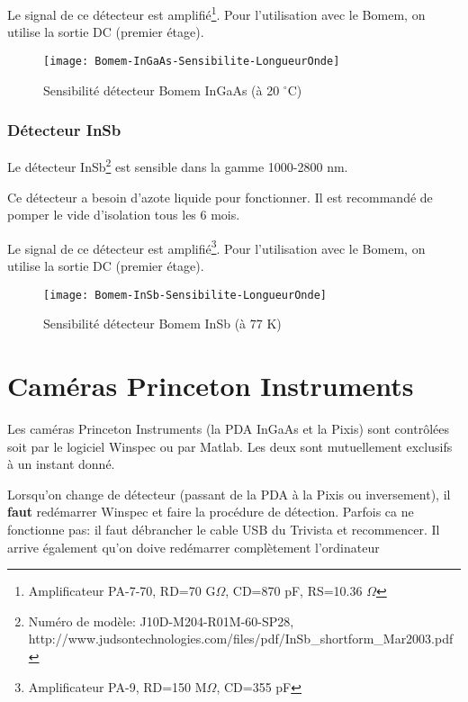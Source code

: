 \documentclass[11pt,francais]{book} %
\begin{document}
Le signal de ce détecteur est amplifié\footnote{Amplificateur PA-7-70, RD=70 G$\Omega$, CD=870 pF, RS=10.36 $\Omega$}.
Pour l'utilisation avec le Bomem, on utilise la sortie DC (premier étage).

\begin{figure}[htbp]
  \centering\texttt{[image: Bomem-InGaAs-Sensibilite-LongueurOnde]}
  \caption{Sensibilité détecteur Bomem InGaAs (à 20 $^{\circ}$C)}
  \label{fig:bomemInGaAs}
\end{figure}



\subsubsection{Détecteur InSb}
Le détecteur InSb\footnote{Numéro de modèle: J10D-M204-R01M-60-SP28, http://www.judsontechnologies.com/files/pdf/InSb\_shortform\_Mar2003.pdf} est sensible dans la gamme 1000-2800 nm.

Ce détecteur a besoin d'azote liquide pour fonctionner.
Il est recommandé de pomper le vide d'isolation tous les 6 mois.

Le signal de ce détecteur est amplifié\footnote{Amplificateur PA-9, RD=150 M$\Omega$, CD=355 pF}.
Pour l'utilisation avec le Bomem, on utilise la sortie DC (premier étage).

\begin{figure}[htbp]
  \centering\texttt{[image: Bomem-InSb-Sensibilite-LongueurOnde]}
  \caption{Sensibilité détecteur Bomem InSb (à 77 K)}
  \label{fig:bomemInSb}
\end{figure}



\section{Caméras Princeton Instruments}

Les caméras Princeton Instruments (la PDA InGaAs et la Pixis) sont contrôlées soit par le logiciel Winspec ou par Matlab.
Les deux sont mutuellement exclusifs à un instant donné.

Lorsqu'on change de détecteur (passant de la PDA à la Pixis ou inversement), il {\bf faut} redémarrer Winspec et faire la procédure de détection.
Parfois ca ne fonctionne pas: il faut débrancher le cable USB du Trivista et recommencer.
Il arrive également qu'on doive redémarrer complètement l'ordinateur
\end{document}
